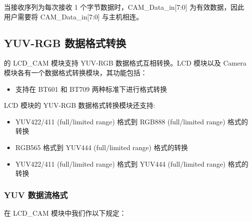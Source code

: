 \documentclass[main\_\_CN.tex]{subfiles}
\begin{document}
\begin{tiplisting}
当接收序列为每次接收 1 个字节数据时，CAM\_Data\_in[7:0] 为有效数据，因此用户需要将 CAM\_Data\_in[7:0] 与主机相连。
\end{tiplisting}

\subsection{YUV-RGB 数据格式转换}
\label{sec:yuvrgb_config}
\chipname{} 的 LCD\_CAM 模块支持 YUV-RGB 数据格式互相转换。LCD 模块以及 Camera 模块各有一个数据格式转换模块，其功能包括：
\begin{itemize}
    \item 支持在 BT601 和 BT709 两种标准下进行格式转换
\end{itemize}

    LCD 模块的 YUV-RGB 数据格式转换模块还支持:
    \begin{itemize}
        \item YUV422/411 (full/limited range) 格式到 RGB888 (full/limited range) 格式的转换
        \item RGB565  格式到 YUV444 (full/limited range) 格式的转换
        \item YUV422/411 (full/limited range) 格式到 YUV444 (full/limited range) 格式的转换
    \end{itemize}

\subsubsection{YUV 数据流格式}
在 \chipname{} LCD\_CAM 模块中我们作以下规定：
\end{document}
